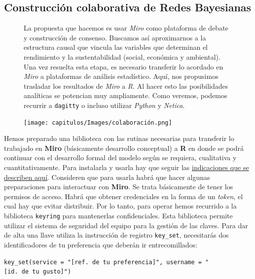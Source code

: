 \documentclass[
  letterpaper,
  DIV=11,
  numbers=noendperiod]{scrreprt}
\begin{document}
\subsection{Construcción colaborativa de Redes
Bayesianas}\label{construcciuxf3n-colaborativa-de-redes-bayesianas}

\begin{figure}

\begin{minipage}{0.50\linewidth}
La propuesta que hacemos es usar \emph{Miro} como plataforma de debate y
construcción de consenso. Buscamos así aproximarnos a la estructura
causal que vincula las variables que determinan el rendimiento y la
sustentabilidad (social, económica y ambiental). Una vez resuelta esta
etapa, es necesario transferir lo acordado en \emph{Miro} a plataformas
de análisis estadístico. Aquí, nos propusimos trasladar los resultados
de \emph{Miro} a \emph{R}. Al hacer esto las posibilidades analíticas se
potencian muy ampliamente. Como veremos, podemos recurrir a
\texttt{dagitty} o incluso utilizar \emph{Python} y
\emph{Netica}.\end{minipage}%
%
\begin{minipage}{0.50\linewidth}
\texttt{[image: capitulos/Images/colaboración.png]}\end{minipage}%

\end{figure}%

Hemos preparado una biblioteca con las rutinas necesarias para
transferir lo trabajado en \textbf{Miro} (básicamente desarrollo
conceptual) a \textbf{R} en donde se podrá continuar con el desarrollo
formal del modelo según se requiera, cualitativa y cuantitativamente.
Para instalarla y usarla hay que seguir las
\href{https://github.com/equihuam/miro2bayesNet}{indicaciones que se
describen aquí}. Consideren que para usarla habrá que hacer algunas
preparaciones para interactuar con \textbf{Miro}. Se trata básicamente
de tener los permisos de acceso. Habrá que obtener credenciales en la
forma de un \emph{token}, el cual hay que evitar distribuir. Por lo
tanto, para operar hemos recurrido a la biblioteca \texttt{keyring} para
mantenerlas confidenciales. Esta biblioteca permite utilizar el sistema
de seguridad del equipo para la gestión de las claves. Para dar de alta
una llave utiliza la instrucción de registro \texttt{key\_set},
necesitarás dos identificadores de tu preferencia que deberán ir
entrecomillados:

\texttt{key\_set(service\ =\ "{[}ref.\ de\ tu\ preferencia{]}",\ username\ =\ "{[}id.\ de\ tu\ gusto{]}")}
\end{document}

